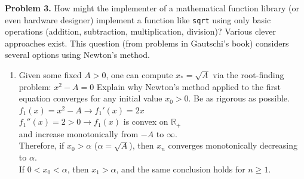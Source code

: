 \documentclass[14pt,a4paper]{article}
\begin{document}
\label{Problem 3}
\large\textbf{Problem 3.} How might the implementer of a mathematical function library (or even hardware designer) implement a function like \texttt{sqrt} using only basic operations (addition, subtraction, multiplication, division)? Various clever approaches exist. This question (from problems in Gautschi's book) considers several options using Newton's method.
\begin{enumerate}
	\label{3a}
	\item Given some fixed $A > 0$, one can compute $x_* = \sqrt{A}$ via the root-finding problem: $x^2 - A = 0$
	Explain why Newton's method applied to the first equation converges for any initial value $x_0 > 0$. Be as rigorous as possible. \\
	\hspace*{2cm}	$f_1(x) = x^2 - A \rightarrow f_1'(x) = 2x$\\
	\hspace*{5.3cm}	$f_1''(x) = 2 > 0 \rightarrow f_1(x)$ is convex on $\mathbb{R}_+$ \\
	and increase monotonically from $-A$ to $\infty$.\\
	Therefore, if $x_0 > \alpha$ ($\alpha = \sqrt{A}$), then $x_n$ converges monotonically decreasing to $\alpha$. \\
	If $0 < x_0 < \alpha$, then $x_1 > \alpha$, and the same conclusion holds for $n \geq 1$.
	

\end{enumerate}
\end{document}
